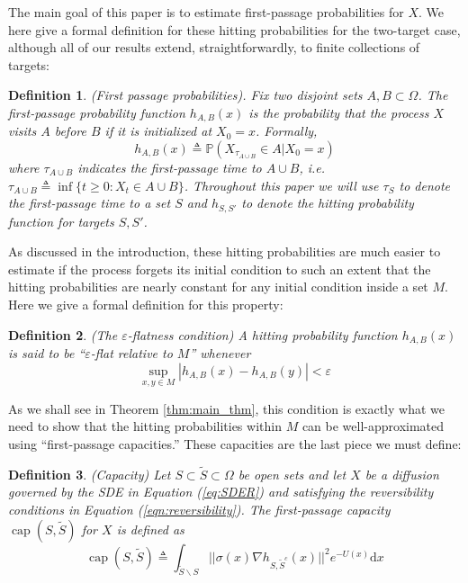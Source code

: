 \documentclass[12pt, nofootinbib,english, amsmath, amssymb, aps, priprint, graphicx,floatfix]{revtex4-1}
\newtheorem{definition}{Definition}
\theoremstyle{plain}
\theoremstyle{definition}
\theoremstyle{plain}
\begin{document}
The main goal of this paper is to estimate first-passage  probabilities for $X$.  We here give a formal definition for these hitting probabilities for the two-target case, although all of our results extend, straightforwardly, to finite collections of targets:

\begin{definition}(First passage probabilities).  Fix two disjoint sets $A,B\subset \Omega$.  The first-passage probability function $h_{A,B}(x)$ is the probability that the process $X$ visits $A$ before $B$ if it is initialized at $X_0=x$.  Formally,
\[ h_{A, B}(x) \triangleq \mathbb{P}(X_{\tau_{A\cup B}}\in A|X_0=x)\]
where $\tau_{A\cup B}$ indicates the first-passage time to $A\cup B$, i.e.\ $\tau_{A\cup B} \triangleq \inf \{ t \geqslant 0 : X_t \in A \cup B \}$.  Throughout this paper we will use $\tau_S$ to denote the first-passage time to a set $S$ and $h_{S,S'}$ to denote the hitting probability function for targets $S,S'$.
\end{definition}

As discussed in the introduction, these hitting probabilities are much easier to estimate if the process forgets its initial condition to such an extent that the hitting probabilities are nearly constant for any initial condition inside a set $M$.  Here we give a formal definition for this property:
\begin{definition}(The $\varepsilon$-flatness condition)  A hitting probability function $h_{A,B}(x)$ is said to be
``$\varepsilon$-flat relative to $M$'' whenever
\[
\sup_{x, y \in M} |h_{A,B}(x) - h_{A,B}(y)| < \varepsilon
\]
\end{definition}
As we shall see in Theorem \ref{thm:main_thm}, this condition is exactly what we need to show that the hitting probabilities within $M$ can be well-approximated using ``first-passage capacities.''  These capacities are the last piece we must define:

\begin{definition}(Capacity)
Let $S \subset \tilde{S} \subset \Omega$ be open sets and let $X$ be a diffusion governed by the SDE in Equation (\ref{eq:SDER}) and satisfying the reversibility conditions in Equation (\ref{eqn:reversibility}).  The first-passage capacity $\ensuremath{\operatorname{cap}} (S, \tilde{S})$ for $X$ is defined as
%
\[ \ensuremath{\operatorname{cap}} (S, \tilde{S}) \triangleq \int_{\tilde S \backslash S}
||\sigma(x) \nabla h_{S, \tilde{S}^c}(x)||^2 e^{- U(x)} \mathrm{d} x \]
%
\end{definition}
\end{document}
